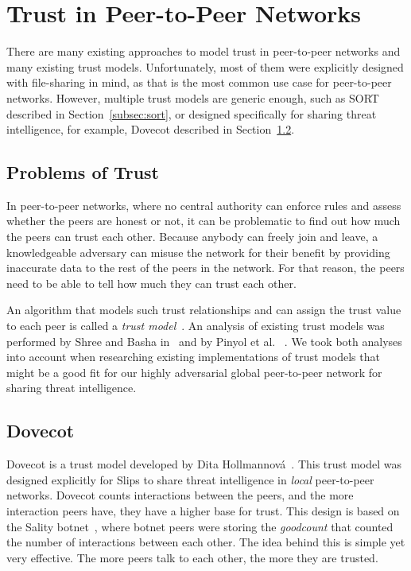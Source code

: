 \section{Trust in Peer-to-Peer Networks}
\label{sec:trust-in-p2p}

There are many existing approaches to model trust in peer-to-peer networks and many existing trust models.
Unfortunately, most of them were explicitly designed with file-sharing in mind, as that is the most common use case for peer-to-peer networks.
However, multiple trust models are generic enough, such as SORT described in Section~\ref{subsec:sort}, or designed specifically for sharing threat intelligence, for example, Dovecot described in Section~\ref{subsec:dovecot}.

\subsection{Problems of Trust}
\label{subsec:problems-of-trust}
In peer-to-peer networks, where no central authority can enforce rules and assess whether the peers are honest or not, it can be problematic to find out how much the peers can trust each other.
Because anybody can freely join and leave, a knowledgeable adversary can misuse the network for their benefit by providing inaccurate data to the rest of the peers in the network.
For that reason, the peers need to be able to tell how much they can trust each other. 

An algorithm that models such trust relationships and can assign the trust value to each peer is called a \textit{trust model}~\cite{wang2003trust}.
An analysis of existing trust models was performed by Shree and Basha in~\cite{shree2014exhaustive} and by Pinyol et al. ~\cite{pinyol2013computational}. 
We took both analyses into account when researching existing implementations of trust models that might be a good fit for our highly adversarial global peer-to-peer network for sharing threat intelligence.

\subsection{Dovecot}
\label{subsec:dovecot}
Dovecot is a trust model developed by Dita Hollmannová~\cite{dita}.
This trust model was designed explicitly for Slips to share threat intelligence in \textit{local} peer-to-peer networks.
Dovecot counts interactions between the peers, and the more interaction peers have, they have a higher base for trust.
This design is based on the Sality botnet~\cite{falliere2011sality}, where botnet peers were storing the \textit{goodcount} that counted the number of interactions between each other.
The idea behind this is simple yet very effective. The more peers talk to each other, the more they are trusted.

